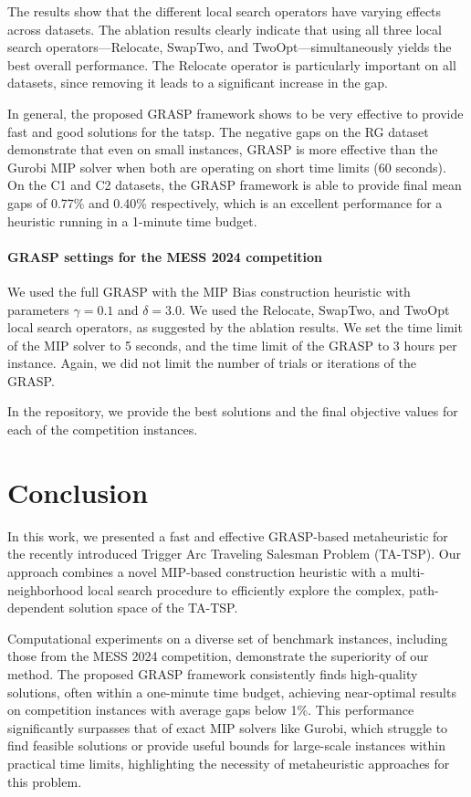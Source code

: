 The results show that the different local search operators have varying effects across datasets.
The ablation results clearly indicate that using all three local search operators—Relocate, SwapTwo, and TwoOpt—simultaneously yields the best overall performance.
The Relocate operator is particularly important on all datasets, since removing it leads to a significant increase in the gap.

In general, the proposed GRASP framework shows to be very effective to provide fast and good solutions for the \gls{tatsp}.
The negative gaps on the RG dataset demonstrate that even on small instances, GRASP is more effective than the Gurobi MIP solver when both are operating on short time limits (60 seconds).
On the C1 and C2 datasets, the GRASP framework is able to provide final mean gaps of 0.77\% and 0.40\% respectively, which is an excellent performance for a heuristic running in a 1-minute time budget.

\paragraph{GRASP settings for the MESS 2024 competition}

We used the full GRASP with the MIP Bias construction heuristic with parameters $\gamma = 0.1$ and $\delta = 3.0$.
We used the Relocate, SwapTwo, and TwoOpt local search operators, as suggested by the ablation results.
We set the time limit of the MIP solver to 5 seconds, and the time limit of the GRASP to 3 hours per instance.
Again, we did not limit the number of trials or iterations of the GRASP.

In the repository, we provide the best solutions and the final objective values for each of the competition instances.


\section{Conclusion}
In this work, we presented a fast and effective GRASP-based metaheuristic for the recently introduced Trigger Arc Traveling Salesman Problem (TA-TSP).
Our approach combines a novel MIP-based construction heuristic with a multi-neighborhood local search procedure to efficiently explore the complex, path-dependent solution space of the TA-TSP.

Computational experiments on a diverse set of benchmark instances, including those from the MESS 2024 competition, demonstrate the superiority of our method. The proposed GRASP framework consistently finds high-quality solutions, often within a one-minute time budget, achieving near-optimal results on competition instances with average gaps below 1\%. This performance significantly surpasses that of exact MIP solvers like Gurobi, which struggle to find feasible solutions or provide useful bounds for large-scale instances within practical time limits, highlighting the necessity of metaheuristic approaches for this problem.

